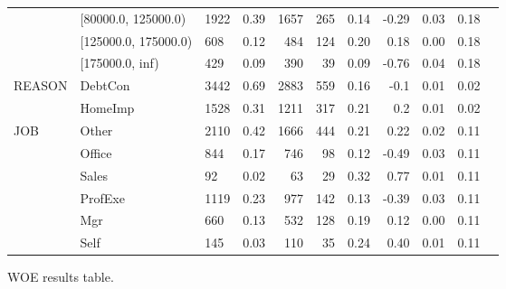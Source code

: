 \begin{landscape}
\begin{figure}[!ht]
\begin{tabular}{lllrrrrrrrr}
    &   [80000.0, 125000.0) &   1922 &         0.39 &  1657 &  265 &     0.14 & -0.29 &    0.03 &      0.18 \\
    &  [125000.0, 175000.0) &    608 &         0.12 &   484 &  124 &     0.20 &  0.18 &    0.00 &      0.18 \\
    &       [175000.0, inf) &    429 &         0.09 &   390 &   39 &     0.09 & -0.76 &    0.04 &      0.18 \\
			\midrule
			  REASON &  DebtCon &   3442 &         0.69 &  2883 &  559 &     0.16 & -0.1 &    0.01 &      0.02 \\
   &  HomeImp &   1528 &         0.31 &  1211 &  317 &     0.21 &  0.2 &    0.01 &      0.02 \\
			\midrule
			      JOB &    Other &   2110 &         0.42 &  1666 &  444 &     0.21 &  0.22 &    0.02 &      0.11 \\
      &   Office &    844 &         0.17 &   746 &   98 &     0.12 & -0.49 &    0.03 &      0.11 \\
      &    Sales &     92 &         0.02 &    63 &   29 &     0.32 &  0.77 &    0.01 &      0.11 \\
      &  ProfExe &   1119 &         0.23 &   977 &  142 &     0.13 & -0.39 &    0.03 &      0.11 \\
      &      Mgr &    660 &         0.13 &   532 &  128 &     0.19 &  0.12 &    0.00 &      0.11 \\
      &     Self &    145 &         0.03 &   110 &   35 &     0.24 &  0.40 &    0.01 &      0.11 \\
			
			\bottomrule
		\end{tabular}
		\caption{WOE results table. \label{woe_1}}
	\end{figure}
	

\end{landscape}
